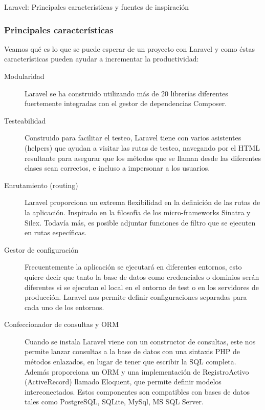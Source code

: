 Laravel: Principales características y fuentes de inspiración

\subsubsection{Principales características}

Veamos qué es lo que se puede esperar de un proyecto con Laravel y como éstas características pueden ayudar a incrementar la productividad:

\begin{description}
    \item[Modularidad] Laravel se ha construido utilizando más de 20 librerías diferentes fuertemente integradas con el gestor de dependencias Composer.
    
    \item[Testeabilidad] Construido para facilitar el testeo, Laravel tiene con varios asistentes (helpers) que ayudan a visitar las rutas de testeo, navegando por el HTML resultante para asegurar que los métodos que se llaman desde las diferentes clases sean correctos, e incluso a impersonar a los usuarios.
    
    \item[Enrutamiento (routing)] Laravel proporciona un extrema flexibilidad en la definición de las rutas de la aplicación. Inspirado en la filosofía de los micro-frameworks Sinatra y Silex. Todavía más, es posible adjuntar funciones de filtro que se ejecuten en rutas específicas.
    
    \item[Gestor de configuración] Frecuentemente la aplicación se ejecutará en diferentes entornos, esto quiere decir que tanto la base de datos como credenciales o dominios serán diferentes si se ejecutan el local en el entorno de test o en los servidores de producción. Laravel nos permite definir configuraciones separadas para cada uno de los entornos.
    
    \item[Confeccionador de consultas y ORM] Cuando se instala Laravel viene con un constructor de consultas, este nos permite lanzar consultas a la base de datos con una sintaxis PHP de métodos enlazados, en lugar de tener que escribir la SQL completa. Además proporciona un ORM y una implementación de RegistroActivo (ActiveRecord) llamado Eloquent, que permite definir modelos interconectados. Estos componentes son compatibles con bases de datos tales como PostgreSQL, SQLite, MySql, MS SQL Server.
    

\end{description}
